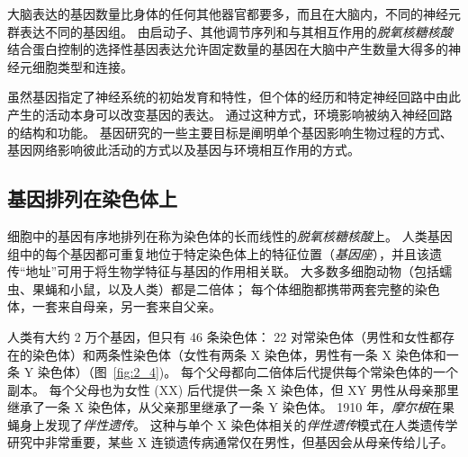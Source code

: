 大脑表达的基因数量比身体的任何其他器官都要多，而且在大脑内，不同的神经元群表达不同的基因组。
由启动子、其他调节序列和与其相互作用的\textit{脱氧核糖核酸}结合蛋白控制的选择性基因表达允许固定数量的基因在大脑中产生数量大得多的神经元细胞类型和连接。


虽然基因指定了神经系统的初始发育和特性，但个体的经历和特定神经回路中由此产生的活动本身可以改变基因的表达。
通过这种方式，环境影响被纳入神经回路的结构和功能。
基因研究的一些主要目标是阐明单个基因影响生物过程的方式、基因网络影响彼此活动的方式以及基因与环境相互作用的方式。



\subsection{基因排列在染色体上}

细胞中的基因有序地排列在称为染色体的长而线性的\textit{脱氧核糖核酸}上。
人类基因组中的每个基因都可重复地位于特定染色体上的特征位置（\textit{基因座}），并且该遗传“地址”可用于将生物学特征与基因的作用相关联。
大多数多细胞动物（包括蠕虫、果蝇和小鼠，以及人类）都是二倍体；
每个体细胞都携带两套完整的染色体，一套来自母亲，另一套来自父亲。


人类有大约 2 万个基因，但只有 46 条染色体：
22 对常染色体（男性和女性都存在的染色体）和两条性染色体（女性有两条 X 染色体，男性有一条 X 染色体和一条 Y 染色体）（图~\ref{fig:2_4})。
每个父母都向二倍体后代提供每个常染色体的一个副本。
每个父母也为女性 (XX) 后代提供一条 X 染色体，但 XY 男性从母亲那里继承了一条 X 染色体，从父亲那里继承了一条 Y 染色体。
1910 年，\textit{摩尔根}在果蝇身上发现了\textit{伴性遗传}。
这种与单个 X 染色体相关的\textit{伴性遗传}模式在人类遗传学研究中非常重要，某些 X 连锁遗传病通常仅在男性，但基因会从母亲传给儿子。


